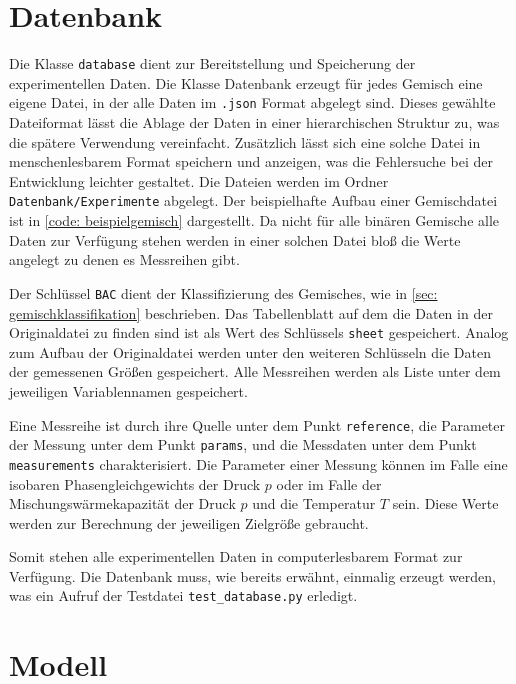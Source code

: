 \documentclass[../thesis.tex]{subfiles}
\begin{document}
\section{Datenbank}

Die Klasse \texttt{database} dient zur Bereitstellung und Speicherung der experimentellen Daten. Die Klasse Datenbank erzeugt für jedes Gemisch eine eigene Datei, in der alle Daten im \texttt{.json} Format abgelegt sind. Dieses gewählte Dateiformat lässt die Ablage der Daten in einer hierarchischen Struktur zu, was die spätere Verwendung vereinfacht. Zusätzlich lässt sich eine solche Datei in menschenlesbarem Format speichern und anzeigen, was die Fehlersuche bei der Entwicklung leichter gestaltet. Die Dateien werden im Ordner \texttt{Datenbank/Experimente} abgelegt. Der beispielhafte Aufbau einer Gemischdatei ist in \autoref{code: beispielgemisch} dargestellt. Da nicht für alle binären Gemische alle Daten zur Verfügung stehen werden in einer solchen Datei bloß die Werte angelegt zu denen es Messreihen gibt.


\label{code: beispielgemisch}

Der Schlüssel \texttt{BAC} dient der Klassifizierung des Gemisches, wie in \autoref{sec: gemischklassifikation} beschrieben. Das Tabellenblatt auf dem die Daten in der Originaldatei zu finden sind ist als Wert des Schlüssels \texttt{sheet} gespeichert. Analog zum Aufbau der Originaldatei werden unter den weiteren Schlüsseln die Daten der gemessenen Größen gespeichert. Alle Messreihen werden als Liste unter dem jeweiligen Variablennamen gespeichert.

Eine Messreihe ist durch ihre Quelle unter dem Punkt \texttt{reference}, die Parameter der Messung unter dem Punkt \texttt{params}, und die Messdaten unter dem Punkt \texttt{measurements} charakterisiert. Die Parameter einer Messung können im Falle eine isobaren Phasengleichgewichts der Druck $ p $ oder im Falle der Mischungswärmekapazität der Druck $ p $ und die Temperatur $ T $ sein. Diese Werte werden zur Berechnung der jeweiligen Zielgröße gebraucht. 

Somit stehen alle experimentellen Daten in computerlesbarem Format zur Verfügung. Die Datenbank muss, wie bereits erwähnt, einmalig erzeugt werden, was ein Aufruf der Testdatei \texttt{test\_database.py} erledigt.

\section{Modell}
\end{document}
